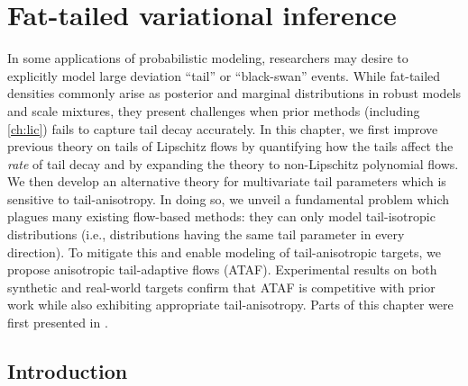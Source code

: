 \documentclass[../../thesis.tex]{subfiles}
\begin{document}



\chapter{Fat-tailed variational inference}
\label{ch:ftvi}

In some applications of probabilistic modeling,
researchers may desire to explicitly model large deviation ``tail''  or ``black-swan''
events. While fat-tailed densities commonly arise as posterior and marginal distributions in
robust models and scale mixtures, they present challenges when
prior methods (including \cref{ch:lic})
fails to capture tail decay accurately.
In this chapter, we first improve previous theory on tails
of Lipschitz flows
by quantifying how the tails affect the \emph{rate} of tail decay
and by expanding the theory to non-Lipschitz polynomial flows.
We then develop an alternative theory for multivariate tail parameters which is
sensitive to tail-anisotropy.
In doing so, we unveil a fundamental problem which plagues many existing flow-based
methods: they can only model tail-isotropic distributions (i.e., distributions
having the same tail parameter in every direction).
To mitigate this and enable modeling of tail-anisotropic targets, we propose
anisotropic tail-adaptive flows (ATAF).
Experimental results on both synthetic and real-world targets confirm that ATAF
is competitive with prior work while also exhibiting appropriate tail-anisotropy.
Parts of this chapter were first presented in .

\section{Introduction}
\label{sec:intro}

\end{document}
